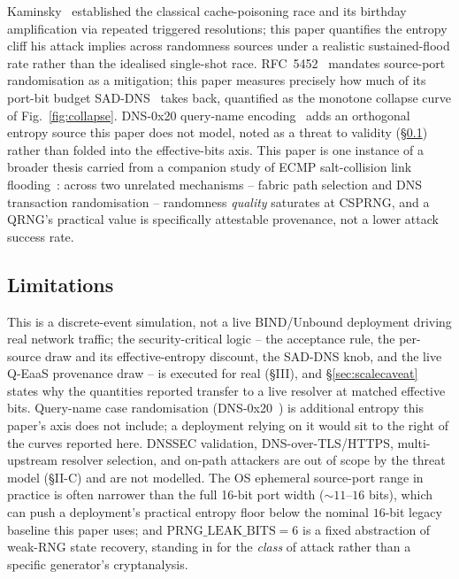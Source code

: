 \documentclass[conference]{IEEEtran}
\begin{document}
Kaminsky~\cite{kaminsky} established the classical cache-poisoning race and its birthday amplification via
repeated triggered resolutions; this paper quantifies the entropy cliff his attack implies across
randomness sources under a realistic sustained-flood rate rather than the idealised single-shot race.
RFC~5452~\cite{rfc5452} mandates source-port randomisation as a mitigation; this paper measures precisely
how much of its port-bit budget SAD-DNS~\cite{saddns} takes back, quantified as the monotone collapse
curve of Fig.~\ref{fig:collapse}. DNS-0x20 query-name encoding~\cite{dagon0x20} adds an orthogonal entropy
source this paper does not model, noted as a threat to validity (\S\ref{sec:limitations}) rather than
folded into the effective-bits axis. This paper is one instance of a broader thesis carried from a
companion study of ECMP salt-collision link flooding~\cite{ecmptwin}: across two unrelated mechanisms --
fabric path selection and DNS transaction randomisation -- randomness \emph{quality} saturates at CSPRNG,
and a QRNG's practical value is specifically attestable provenance, not a lower attack success rate.

\subsection{Limitations}
\label{sec:limitations}

This is a discrete-event simulation, not a live BIND/Unbound deployment driving real network traffic; the
security-critical logic -- the acceptance rule, the per-source draw and its effective-entropy discount, the
SAD-DNS knob, and the live Q-EaaS provenance draw -- is executed for real (\S III), and
\S\ref{sec:scalecaveat} states why the quantities reported transfer to a live resolver at matched effective
bits. Query-name case randomisation (DNS-0x20~\cite{dagon0x20}) is additional entropy this paper's axis
does not include; a deployment relying on it would sit to the right of the curves reported here.
DNSSEC validation, DNS-over-TLS/HTTPS, multi-upstream resolver selection, and on-path attackers are out of
scope by the threat model (\S II-C) and are not modelled. The OS ephemeral source-port range in practice
is often narrower than the full 16-bit port width ($\sim\!11$--$16$ bits), which can push a deployment's
practical entropy floor below the nominal $16$-bit legacy baseline this paper uses; and
$\mathrm{PRNG\_LEAK\_BITS}=6$ is a fixed abstraction of weak-RNG state recovery, standing in for the
\emph{class} of attack rather than a specific generator's cryptanalysis.
\end{document}

